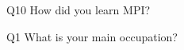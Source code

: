 \begin{description}%
\item{Q10} How did you learn MPI?%
\item{Q1} What is your main occupation?%
\end{description}%
